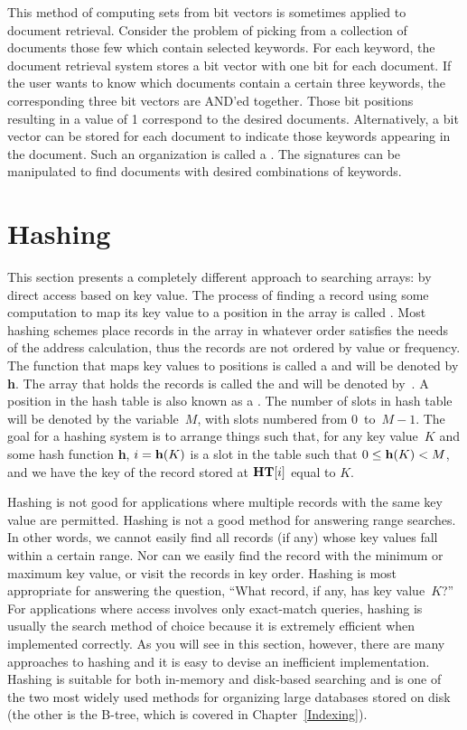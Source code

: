 This method of computing sets from bit vectors is sometimes applied to
document retrieval.
Consider the problem of picking from a collection of documents those
few which contain selected keywords.
For each keyword, the document retrieval system stores a bit vector
with one bit for each document.
If the user wants to know which documents contain a certain three
keywords, the corresponding three bit vectors are AND'ed together.
Those bit positions resulting in a value of 1 correspond to the
desired documents.
Alternatively, a bit vector can be stored for each document to
indicate those keywords appearing in the document.
Such an organization is called a .
The signatures can be manipulated to find documents with desired
combinations of keywords.

\section{Hashing}
\label{Hash}

This section presents a completely different approach to searching
arrays: by direct access based on key value.
The process of finding a record using some computation to map its key
value to a position in the array is called .
Most hashing schemes place records in the array in whatever order
satisfies the needs of the address calculation, thus the records are
not ordered by value or frequency.
The function that maps key values to positions is called a
 and will be denoted by {\bf h}.
The array that holds the records is called the  and
will be denoted by~.
A position in the hash table is also known as a .
The number of slots in hash table~ will be denoted by the
variable~\(M\), with slots numbered from 0~to~\(M-1\).
The goal for a hashing system is to arrange things such that, for any
key value~\(K\) and some hash function {\bf h}, \(i = {\bf h}(K)\)
is a slot in the table such that \(0 \leq {\bf h}(K) < M\), 
and we have the key of the record stored at \({\textbf{HT}}[i]\) equal to \(K\).

Hashing is not good for applications where multiple
records with the same key value are permitted.
Hashing is not a good method for answering range
searches.
In other words, we cannot easily find all records (if any) whose key
values fall within a certain range.
Nor can we easily find the record with the minimum or maximum key
value, or visit the records in key order.
Hashing is most appropriate for answering the question,
``What record, if any, has key value~\(K\)?''
For applications where access involves only exact-match queries,
hashing is usually the search method of choice because it is extremely
efficient when implemented correctly.
As you will see in this section, however, there are many approaches
to hashing and it is easy to devise an inefficient implementation.
Hashing is suitable for both in-memory and disk-based searching and
is one of the two most widely used methods for organizing large
databases stored on disk (the other is the B-tree,
which is covered in Chapter~\ref{Indexing}).

